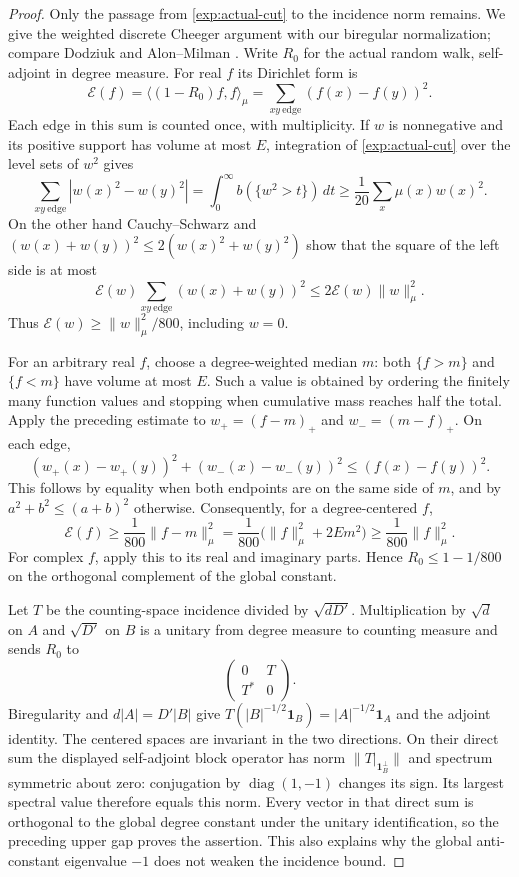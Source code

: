 \begin{proof}
Only the passage from \eqref{exp:actual-cut} to the incidence norm
remains. We give the weighted discrete Cheeger argument with our
biregular normalization; compare Dodziuk \cite{Dodziuk1984} and
Alon--Milman \cite{AM1985}. Write $R_0$ for the actual random walk, self-adjoint in
degree measure. For real $f$ its Dirichlet form is
\[
 \mathcal E(f)=\langle(1-R_0)f,f\rangle_\mu
             =\sum_{xy\ \mathrm{edge}}(f(x)-f(y))^2.
\]
Each edge in this sum is counted once, with multiplicity. If $w$
is nonnegative and its positive support has volume at most $E$,
integration of \eqref{exp:actual-cut} over the level sets of $w^2$
gives
\[
 \sum_{xy\ \mathrm{edge}}|w(x)^2-w(y)^2|
 =\int_0^\infty b(\{w^2>t\})\,dt
 \geq\frac1{20}\sum_x\mu(x)w(x)^2.
\]
On the other hand Cauchy--Schwarz and
$(w(x)+w(y))^2\leq2(w(x)^2+w(y)^2)$ show that the square of the
left side is at most
\[
 \mathcal E(w)\sum_{xy\ \mathrm{edge}}(w(x)+w(y))^2
 \leq2\mathcal E(w)\|w\|_\mu^2.
\]
Thus $\mathcal E(w)\geq\|w\|_\mu^2/800$, including $w=0$.

For an arbitrary real $f$, choose a degree-weighted median $m$:
both $\{f>m\}$ and $\{f<m\}$ have volume at most $E$.
Such a value is obtained by ordering the finitely many function
values and stopping when cumulative mass reaches half the total.
Apply the preceding estimate to
$w_+=(f-m)_+$ and $w_-=(m-f)_+$. On each edge,
\[
 (w_+(x)-w_+(y))^2+(w_-(x)-w_-(y))^2
 \leq(f(x)-f(y))^2.
\]
This follows by equality when both endpoints are on the same side
of $m$, and by $a^2+b^2\leq(a+b)^2$ otherwise. Consequently,
for a degree-centered $f$,
\[
 \mathcal E(f)\geq\frac1{800}\|f-m\|_\mu^2
 =\frac1{800}\bigl(\|f\|_\mu^2+2E m^2\bigr)
 \geq\frac1{800}\|f\|_\mu^2.
\]
For complex $f$, apply this to its real and imaginary parts. Hence
$R_0\leq1-1/800$ on the orthogonal complement of the global
constant.

Let $T$ be the counting-space incidence divided by $\sqrt{dD'}$.
Multiplication by $\sqrt d$ on $A$ and $\sqrt{D'}$ on $B$ is
a unitary from degree measure to counting measure and sends $R_0$
to
\[
 \begin{pmatrix}0&T\\T^*&0\end{pmatrix}.
\]
Biregularity and $d|A|=D'|B|$ give
$T(|B|^{-1/2}\mathbf1_B)=|A|^{-1/2}\mathbf1_A$ and the
adjoint identity. The centered spaces are invariant in the two
directions. On their direct sum the displayed self-adjoint block
operator has norm $\|T|_{\mathbf1_B^\perp}\|$ and spectrum symmetric
about zero: conjugation by $\operatorname{diag}(1,-1)$ changes its
sign. Its largest spectral value therefore equals this norm.
Every vector in that direct sum is orthogonal to the global
degree constant under the unitary identification, so the preceding
upper gap proves the assertion. This also explains why the global
anti-constant eigenvalue $-1$ does not weaken the incidence bound.
\end{proof}

